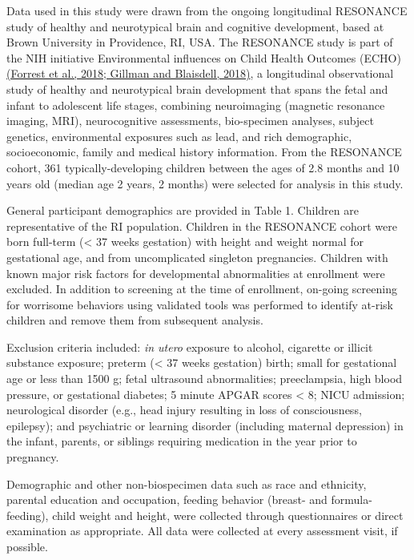 \documentclass[a4paper]{article}
\begin{document}
Data used in this study were drawn from the ongoing longitudinal
RESONANCE study of healthy and neurotypical brain and cognitive
development, based at Brown University in Providence, RI, USA. The
RESONANCE study is part of the NIH initiative Environmental influences
on Child Health Outcomes (ECHO)
\href{https://www.zotero.org/google-docs/?0tZanX}{(Forrest et al., 2018;
Gillman and Blaisdell, 2018)}, a longitudinal observational study of
healthy and neurotypical brain development that spans the fetal and
infant to adolescent life stages, combining neuroimaging (magnetic
resonance imaging, MRI), neurocognitive assessments, bio-specimen
analyses, subject genetics, environmental exposures such as lead, and
rich demographic, socioeconomic, family and medical history information.
From the RESONANCE cohort, 361 typically-developing children between the
ages of 2.8 months and 10 years old (median age 2 years, 2 months) were
selected for analysis in this study.

General participant demographics are provided in Table 1. Children are
representative of the RI population. Children in the RESONANCE cohort
were born full-term (\textless{} 37 weeks gestation) with height and
weight normal for gestational age, and from uncomplicated singleton
pregnancies. Children with known major risk factors for developmental
abnormalities at enrollment were excluded. In addition to screening at
the time of enrollment, on-going screening for worrisome behaviors using
validated tools was performed to identify at-risk children and remove
them from subsequent analysis.

Exclusion criteria included: \emph{in utero} exposure to alcohol,
cigarette or illicit substance exposure; preterm (\textless{} 37 weeks
gestation) birth; small for gestational age or less than 1500 g; fetal
ultrasound abnormalities; preeclampsia, high blood pressure, or
gestational diabetes; 5 minute APGAR scores \textless{} 8; NICU
admission; neurological disorder (e.g., head injury resulting in loss of
consciousness, epilepsy); and psychiatric or learning disorder
(including maternal depression) in the infant, parents, or siblings
requiring medication in the year prior to pregnancy.

Demographic and other non-biospecimen data such as race and ethnicity,
parental education and occupation, feeding behavior (breast- and
formula-feeding), child weight and height, were collected through
questionnaires or direct examination as appropriate. All data were
collected at every assessment visit, if possible.
\end{document}

